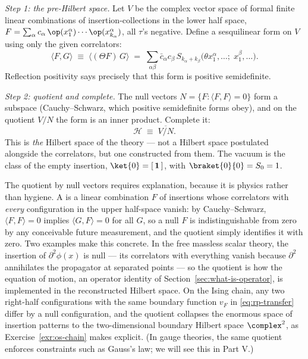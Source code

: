 \emph{Step 1: the pre-Hilbert space.} Let $V$ be the complex vector space of
formal finite linear combinations of insertion-collections in the lower half
space, $F = \sum_\alpha c_\alpha\, \op(x_1^\alpha)\cdots\op(x^\alpha_{k_\alpha})$,
all $\tau$'s negative. Define a sesquilinear form on $V$ using only the given
correlators:
\begin{equation}
\langle F, G\rangle \;\equiv\; \big\langle (\Theta F)\, G \big\rangle
\;=\; \sum_{\alpha\beta} \bar c_\alpha c_\beta\,
S_{k_\alpha + k_\beta}\big(\theta x^\alpha_1, \dots;\; x^\beta_1, \dots\big).
\label{eq:os-inner-product}
\end{equation}
Reflection positivity says precisely that this form is positive semidefinite.

\emph{Step 2: quotient and complete.} The null vectors $N = \{F : \langle F,
F\rangle = 0\}$ form a subspace (Cauchy--Schwarz, which positive semidefinite
forms obey), and on the quotient $V/N$ the form is an inner product.
Complete it:
\begin{equation}
\mathcal{H} \;\equiv\; \overline{V / N}.
\end{equation}
This is \emph{the} Hilbert space of the theory --- not a Hilbert space
postulated alongside the correlators, but one constructed from them. The
vacuum is the class of the empty insertion, $\ket{0} = [\,\mathbf{1}\,]$, with
$\braket{0}{0} = S_0 = 1$.

The quotient by null vectors requires explanation, because it is physics
rather than hygiene. A  is a linear combination $F$
of insertions whose correlators with \emph{every} configuration in the upper
half-space vanish: by Cauchy--Schwarz, $\langle F, F\rangle = 0$ implies
$\langle G, F \rangle = 0$ for all $G$, so a null $F$ is indistinguishable
from zero by any conceivable future measurement, and the quotient simply
identifies it with zero. Two examples make this concrete. In the free
massless scalar theory, the insertion of $\partial^2\phi(x)$ is null --- its
correlators with everything vanish because $\partial^2$ annihilates the
propagator at separated points --- so the quotient is how the equation of
motion, an operator identity of Section~\ref{sec:what-is-operator}, is
implemented in the reconstructed Hilbert space. On the Ising chain, any two
right-half configurations with the same boundary function $v_F$ in
\eqref{eq:rp-transfer} differ by a null configuration, and the quotient
collapses the enormous space of insertion patterns to the two-dimensional
boundary Hilbert space $\complex^2$, as Exercise~\ref{exr:os-chain} makes
explicit. (In gauge theories, the same quotient enforces constraints such as
Gauss's law; we will see this in Part V.)


